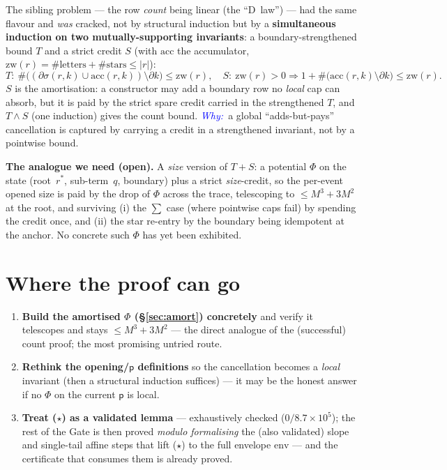 \documentclass[11pt]{article}
\newcommand{\rs}[1]{\lvert #1\rvert}                 %
\newcommand{\sig}{\sigma}                            %
\newcommand{\dpar}{\partial}                         %
\newcommand{\pot}{\mathsf{p}}                        %
\newcommand{\WHY}{\textit{\textcolor{blue}{Why:\ }}}
\theoremstyle{definition}
\begin{document}
The sibling problem --- the row \emph{count} being linear (the ``D~law'') --- had the same flavour and \emph{was} cracked,
not by structural induction but by a \textbf{simultaneous induction on two mutually-supporting invariants}: a
boundary-strengthened bound $T$ and a strict credit $S$ (with $\mathrm{acc}$ the accumulator, $\mathrm{zw}(r)=\#\text{letters}+\#\text{stars}\le\rs r$):
\[
T:\ \#\bigl((\dpar\sig(r,k)\cup\mathrm{acc}(r,k))\setminus\dpar k\bigr)\le\mathrm{zw}(r),
\quad
S:\ \mathrm{zw}(r)>0\Rightarrow 1+\#\bigl(\mathrm{acc}(r,k)\setminus\dpar k\bigr)\le\mathrm{zw}(r).
\]
$S$ is the amortisation: a constructor may add a boundary row no \emph{local} cap can absorb, but it is paid by the
strict spare credit carried in the strengthened $T$, and $T\wedge S$ (one induction) gives the count bound.
\WHY a global ``adds-but-pays'' cancellation is captured by carrying a credit in a strengthened invariant, not by a
pointwise bound.

\textbf{The analogue we need (open).} A \emph{size} version of $T+S$: a potential $\Phi$ on the state
(root~$r^{*}$, sub-term~$q$, boundary) plus a strict \emph{size}-credit, so the per-event opened size
is paid by the drop of $\Phi$ across the trace, telescoping to $\le M^3+3M^2$ at the root, and surviving (i) the $\sum$
case (where pointwise caps fail) by spending the credit once, and (ii) the star re-entry by the boundary being idempotent
at the anchor. No concrete such $\Phi$ has yet been exhibited.

\section{Where the proof can go}

\begin{enumerate}[leftmargin=1.6em,itemsep=3pt]
\item \textbf{Build the amortised $\Phi$ (\S\ref{sec:amort}) concretely} and verify it telescopes and stays $\le M^3+3M^2$
--- the direct analogue of the (successful) count proof; the most promising untried route.
\item \textbf{Rethink the opening/$\pot$ definitions} so the cancellation becomes a \emph{local} invariant (then a
structural induction suffices) --- it may be the honest answer if no $\Phi$ on the current $\pot$ is local.
\item \textbf{Treat ($\star$) as a validated lemma} --- exhaustively checked ($0/8.7\times10^5$); the rest of the Gate is
then proved \emph{modulo formalising} the (also validated) slope and single-tail affine steps that lift ($\star$) to the
full envelope $\mathrm{env}$ --- and the certificate that consumes them is already proved.
\end{enumerate}
\end{document}
